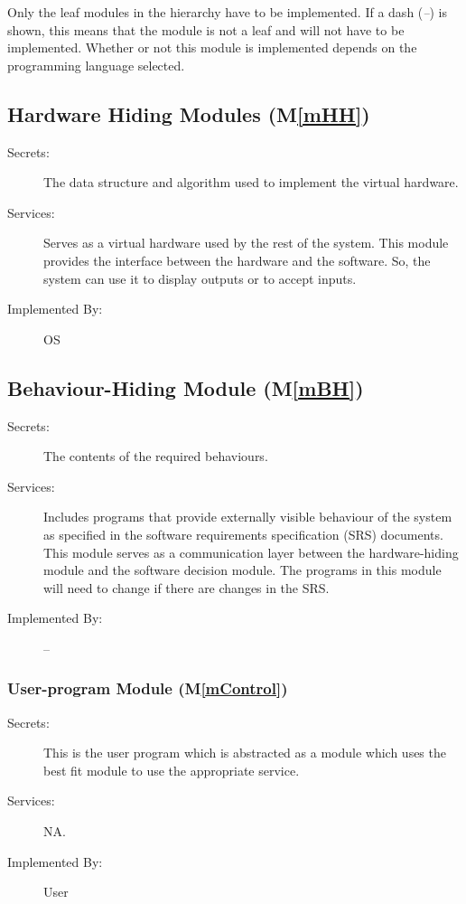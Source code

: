 \documentclass[12pt, titlepage]{article}
\newcommand{\mref}[1]{M\ref{#1}}
\begin{document}
Only the leaf modules in the hierarchy have to be implemented. If a dash
(\emph{--}) is shown, this means that the module is not a leaf and will not have
to be implemented. Whether or not this module is implemented depends on the
programming language selected.

\subsection{Hardware Hiding Modules (\mref{mHH})}

\begin{description}
\item[Secrets:]The data structure and algorithm used to implement the virtual
  hardware.
\item[Services:]Serves as a virtual hardware used by the rest of the
  system. This module provides the interface between the hardware and the
  software. So, the system can use it to display outputs or to accept inputs.
\item[Implemented By:] OS
\end{description}

\subsection{Behaviour-Hiding Module (\mref{mBH})}

\begin{description}
\item[Secrets:]The contents of the required behaviours.
\item[Services:]Includes programs that provide externally visible behaviour of
  the system as specified in the software requirements specification (SRS)
  documents. This module serves as a communication layer between the
  hardware-hiding module and the software decision module. The programs in this
  module will need to change if there are changes in the SRS.
\item[Implemented By:] --
\end{description}
\subsubsection{User-program Module (\mref{mControl})}

\begin{description}
\item[Secrets:]This is the user program which is abstracted as a module which
  uses the best fit module to use the appropriate service. 
	\item[Services:] NA.
	\item[Implemented By:] User
\end{description}
\end{document}
